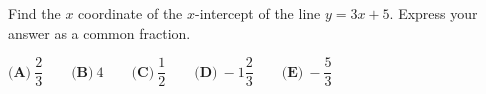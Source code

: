 Find the $x$ coordinate of the $x$-intercept of the line $y=3x+5$. Express your answer as a common fraction.

$\textbf{(A)}~\dfrac{2}{3}\qquad\textbf{(B)}~4\qquad\textbf{(C)}~\dfrac{1}{2}\qquad\textbf{(D)}~-1 \dfrac{2}{3}\qquad\textbf{(E)}~-\dfrac{5}{3}\qquad$
